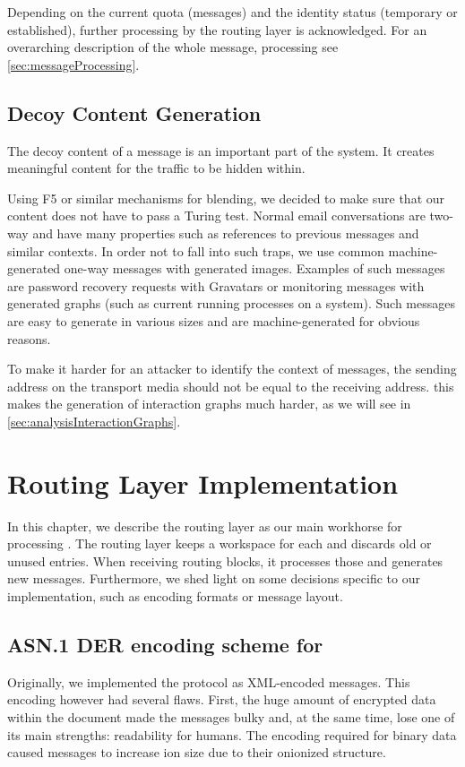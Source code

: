 Depending on the current quota (messages) and the identity status (temporary or established), further processing by the routing layer is acknowledged. For an overarching description of the whole message, processing see \cref{sec:messageProcessing}.


\section{Decoy Content Generation}
The decoy content of a message is an important part of the \MessageVortex{} system. It creates meaningful content for the traffic to be hidden within.

Using F5 or similar mechanisms for blending, we decided to make sure that our content does not have to pass a Turing test. Normal email conversations are two-way and have many properties such as references to previous messages and similar contexts. In order not to fall into such traps, we use common machine-generated one-way messages with generated images. Examples of such messages are password recovery requests with Gravatars or monitoring messages with generated graphs (such as current running processes on a system). Such messages are easy to generate in various sizes and are machine-generated for obvious reasons.

To make it harder for an attacker to identify the context of messages, the sending address on the transport media should not be equal to the receiving address. this makes the generation of interaction graphs much harder, as we will see in \cref{sec:analysisInteractionGraphs}.

\chapter{Routing Layer Implementation}\label{sec:routingImplementation}
In this chapter, we describe the routing layer as our main workhorse for processing \VortexMessages. The routing layer keeps a workspace for each  and discards old or unused entries. When receiving routing blocks, it processes those and generates new messages. Furthermore, we shed light on some decisions specific to our implementation, such as encoding formats or message layout.

\section{ASN.1 DER encoding scheme for \VortexMessages}
Originally, we implemented the protocol as XML-encoded messages. This encoding however had several flaws. First, the huge amount of encrypted data within the document made the messages bulky and, at the same time, lose one of its main strengths: readability for humans. The encoding required for binary data caused messages to increase ion size due to their onionized structure. 

